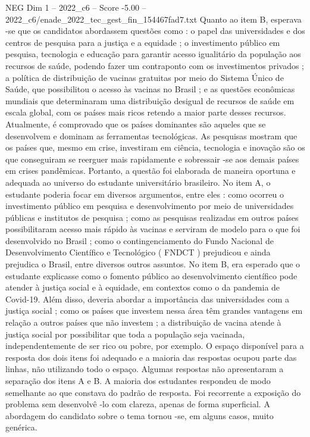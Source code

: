 \begin{textsample}{NEG Dim 1 – 2022\_c6 – Score -5.00 – 2022\_c6/enade\_2022\_tec\_gest\_fin\_154467fad7.txt}
Quanto ao item B, esperava -se que os candidatos abordassem questões como : o papel das universidades e dos centros de pesquisa para a justiça e a equidade ; o investimento público em pesquisa, tecnologia e educação para garantir acesso igualitário da população aos recursos de saúde, podendo fazer um contraponto com os investimentos privados ; a política de distribuição de vacinas gratuitas por meio do Sistema Único de Saúde, que possibilitou o acesso às vacinas no Brasil ; e as questões econômicas mundiais que determinaram uma distribuição desigual de recursos de saúde em escala global, com os países mais ricos retendo a maior parte desses recursos.
Atualmente, é comprovado que os países dominantes são aqueles que se desenvolvem e dominam as ferramentas tecnológicas.
As pesquisas mostram que os países que, mesmo em crise, investiram em ciência, tecnologia e inovação são os que conseguiram se reerguer mais rapidamente e sobressair -se aos demais países em crises pandêmicas.
Portanto, a questão foi elaborada de maneira oportuna e adequada ao universo do estudante universitário brasileiro.
No item A, o estudante poderia focar em diversos argumentos, entre eles : como ocorreu o investimento público em pesquisa e desenvolvimento por meio de universidades públicas e institutos de pesquisa ; como as pesquisas realizadas em outros países possibilitaram acesso mais rápido às vacinas e serviram de modelo para o que foi desenvolvido no Brasil ; como o contingenciamento do Fundo Nacional de Desenvolvimento Científico e Tecnológico ( FNDCT ) prejudicou e ainda prejudica o Brasil, entre diversos outros assuntos.
No item B, era esperado que o estudante explicasse como o fomento público ao desenvolvimento científico pode atender à justiça social e à equidade, em contextos como o da pandemia de Covid-19.
Além disso, deveria abordar a importância das universidades com a justiça social ; como os países que investem nessa área têm grandes vantagens em relação a outros países que não investem ; a distribuição de vacina atende à justiça social por possibilitar que toda a população seja vacinada, independentemente de ser rico ou pobre, por exemplo.
O espaço disponível para a resposta dos dois itens foi adequado e a maioria das respostas ocupou parte das linhas, não utilizando todo o espaço.
Algumas respostas não apresentaram a separação dos itens A e B.
A maioria dos estudantes respondeu de modo semelhante ao que constava do padrão de resposta.
Foi recorrente a exposição do problema sem desenvolvê -lo com clareza, apenas de forma superficial.
A abordagem do candidato sobre o tema tornou -se, em alguns casos, muito genérica.

\end{textsample}
